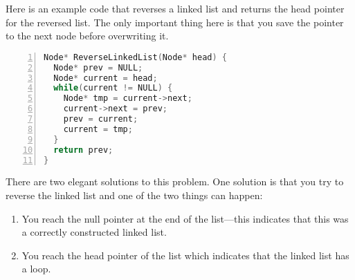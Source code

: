 \begin{comment}
Solution from Ian Varley

Invert all the words in a sentence: ``it was the best of times''
$\mapsto$ ``ti saw eht tseb fo semit''

The solution to this problem differs if we need to do it in-place or not. Assuming we do 
not, a Python solution is simple:

\begin{verbatim} 
def invert(sentence):
    words = sentence.split()
    output = []
    for word in words:
        output.append(reverse(word))
    return ' '.join(output)
 
def reverse(word):
    l = list(word)
    l.reverse()
    return ''.join(l)
\end{verbatim} 

Sample run:
\begin{verbatim} 
>> invert("it was the best of times")

ti saw eht tseb fo semit
\end{verbatim} 

This algorithm should run in $O(n+m)$ time where $n$ is the number of words and $m$ is the 
number of characters. The outer loop does a constant number of operations for each word, 
and the inner loop does a constant number of operations for each letter (assuming 
``reverse'' is implemented in $O(n)$ time).
\end{comment}

Here is an example code that reverses a linked list and returns the
head pointer for the reversed list. The only
important thing here is that you save the pointer to the next node
before overwriting it.
\begin{lstlisting}[basicstyle=\footnotesize,numbers=left,breaklines=true,language=C++]
Node* ReverseLinkedList(Node* head) {
  Node* prev = NULL;
  Node* current = head;
  while(current != NULL) {
    Node* tmp = current->next;
    current->next = prev;
    prev = current;
    current = tmp;
  }
  return prev;
}
\end{lstlisting}

 There are two elegant solutions to this problem. One 
solution is that you try to reverse the linked list and one of the two things can happen:
\begin{enumerate}
\itemsep 1pt

\item You reach the null pointer at the end of the 
list---this indicates that this was a correctly constructed linked list. 
\item You reach the head pointer of the list which indicates that the linked list has a loop.
\end{enumerate}

